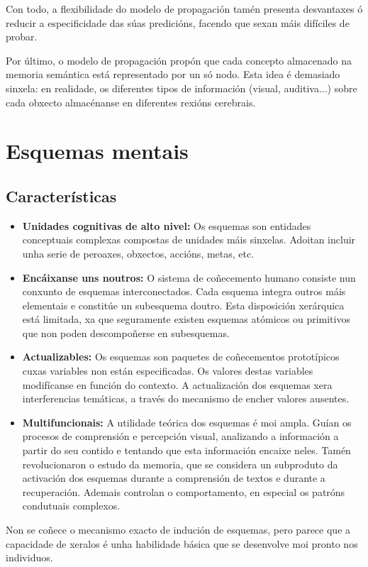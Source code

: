 \documentclass[a4paper,11pt]{article}
\begin{document}
Con todo, a flexibilidade do modelo de propagación tamén presenta desvantaxes ó reducir a especificidade das súas predicións, facendo que sexan máis difíciles de probar. 

Por último, o modelo de propagación propón que cada concepto almacenado na memoria semántica está representado por un só nodo. Esta idea é demasiado sinxela: en realidade, os diferentes tipos de información (visual, auditiva...) sobre cada obxecto almacénanse en diferentes rexións cerebrais. 

\section{Esquemas mentais}
\subsection{Características}
\begin{itemize}
	\item \textbf{Unidades cognitivas de alto nivel:} Os esquemas son entidades conceptuais 
	complexas compostas de unidades máis sinxelas. Adoitan incluir unha serie de peroaxes, obxectos, 
	accións, metas, etc.
	\item \textbf{Encáixanse uns noutros:} O sistema de coñecemento humano consiste nun conxunto de 
	esquemas interconectados. Cada esquema integra outros máis elementais e constitúe un subesquema 
	doutro. Esta disposición xerárquica está limitada, xa que seguramente existen esquemas atómicos 
	ou primitivos que non poden descompoñerse en subesquemas.
	\item \textbf{Actualizables:} Os esquemas son paquetes de coñecementos prototípicos cuxas 
	variables non están especificadas. Os valores destas variables modifícanse en función do 
	contexto. A actualización dos esquemas xera interferencias temáticas, a través do mecanismo de 
	encher valores ausentes.
	\item \textbf{Multifuncionais:} A utilidade teórica dos esquemas é moi ampla. Guían os procesos 
	de comprensión e percepción visual, analizando a información a partir do seu contido e tentando 
	que esta información encaixe neles. Tamén revolucionaron o estudo da memoria, que se considera 
	un subproduto da activación dos esquemas durante a comprensión de textos e durante a 
	recuperación. Ademais controlan o comportamento, en especial os patróns condutuais complexos.
\end{itemize}

Non se coñece o mecanismo exacto de indución de esquemas, pero parece que a capacidade de xeralos é unha habilidade básica que se desenvolve moi pronto nos individuos.
\end{document}
